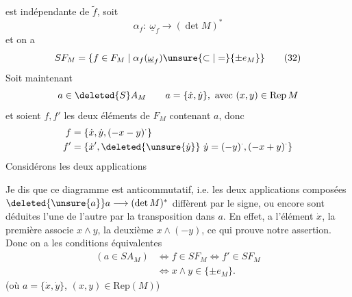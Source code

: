 est indépendante de $\widetilde f$, soit
\[
\alpha_f:\ \underline{\omega}_f\longrightarrow(\det M)^*\tag*{(31)}
\]
et on a
\[
SF_M=\{f\in F_M\mid\alpha_f(\underline{\omega}_f)\unsure{\subset|=}\{\pm e_M\}\}\tag*{(32)}
\]
Soit maintenant
\[
a\in\deleted{S}A_M\qquad a=\{\dot x,\dot y\},\ \text{avec }(x,y)\in\mathrm{Rep}\,M
\]
et soient $f,f'$ les deux éléments de $F_M$ contenant $a$, donc
\[
\begin{aligned}
f&=\{\dot x,\dot y,(-x-y)^{\cdot}\}\\
f'&=\{\dot x',\deleted{\unsure{\dot y}}\ \dot y=(-y)^{\cdot},(-x+y)^{\cdot}\}
\end{aligned}
\]
Considérons les deux applications

Je dis que ce diagramme est anticommutatif, i.e. les deux applications composées $\deleted{\unsure{a}}a\longrightarrow(\det M)^*$ diffèrent par le signe, ou encore sont déduites l'une de l'autre par la transposition dans $a$. En effet, a l'élément $\dot x$, la première associe $x\wedge y$, la deuxième $x\wedge(-y)$, ce qui prouve notre assertion. Donc on a les conditions équivalentes
\[
\begin{aligned}
(a\in SA_M)&\iff f\in SF_M\iff f'\in SF_M\\
&\iff x\wedge y\in\{\pm e_M\}.
\end{aligned}\tag*{(34)}
\]
(où $a=\{\dot x,\dot y\}$, $(x,y)\in\mathrm{Rep}(M)$)

